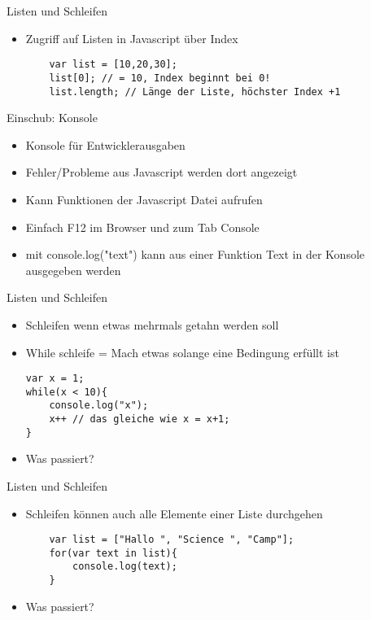 \documentclass[18pt]{beamer}
\begin{document}
\begin{frame}[fragile]{Listen und Schleifen}
\begin{itemize}
	\item Zugriff auf Listen in Javascript über Index
	\begin{lstlisting}
	var list = [10,20,30];
	list[0]; // = 10, Index beginnt bei 0!
	list.length; // Länge der Liste, höchster Index +1 
	\end{lstlisting}
\end{itemize}
\end{frame}

\begin{frame}[fragile]{Einschub: Konsole}
\begin{itemize}
	\item Konsole für Entwicklerausgaben
	\item Fehler/Probleme aus Javascript werden dort angezeigt
	\item Kann Funktionen der Javascript Datei aufrufen
	\item Einfach F12 im Browser und zum Tab \glqq Console\grqq
	\item mit console.log("text") kann aus einer Funktion Text in der Konsole ausgegeben werden
\end{itemize}
\end{frame}


\begin{frame}[fragile]{Listen und Schleifen}
\begin{itemize}
\item Schleifen wenn etwas mehrmals getahn werden soll
\item While schleife = \glqq Mach etwas solange eine Bedingung erfüllt ist\grqq
\begin{lstlisting}
var x = 1;
while(x < 10){
	console.log("x");
	x++ // das gleiche wie x = x+1;
}
\end{lstlisting}
\item Was passiert? 
\end{itemize}
\end{frame}

\begin{frame}[fragile]{Listen und Schleifen}
\begin{itemize}
	\item Schleifen können auch alle Elemente einer Liste durchgehen
	\begin{lstlisting}
	var list = ["Hallo ", "Science ", "Camp"];
	for(var text in list){
		console.log(text);
	}
	\end{lstlisting}
	\item Was passiert? 
\end{itemize}
\end{frame}
\end{document}
